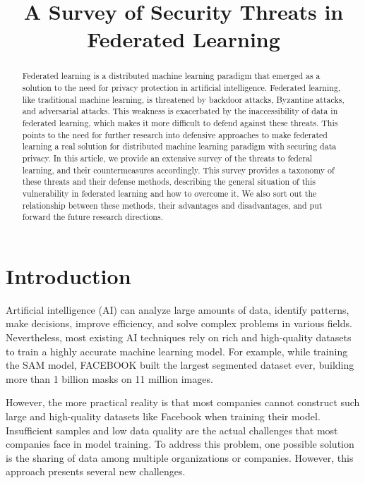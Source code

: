\documentclass[conference]{IEEEtran}
\begin{document}
\title{A Survey of Security Threats in Federated Learning}


\maketitle

\begin{abstract}
    Federated learning is a distributed machine learning paradigm that emerged as a solution to the need for privacy protection in artificial intelligence. 
    Federated learning, like traditional machine learning, is threatened by backdoor attacks, Byzantine attacks, and adversarial attacks. 
    This weakness is exacerbated by the inaccessibility of data in federated learning, 
    which makes it more difficult to defend against these threats.
    This points to the need for further research into defensive approaches to make federated learning a real solution for distributed machine learning paradigm with securing data privacy.
    In this article, we provide an extensive survey of the threats to federal learning, 
    and their countermeasures accordingly. 
    This survey provides a taxonomy of these threats and their defense methods, 
    describing the general situation of this vulnerability in federated learning and how to overcome it. 
    We also sort out the relationship between these methods, their advantages and disadvantages, and put forward the future research directions.
\end{abstract}



\section{Introduction}
Artificial intelligence (AI) can analyze large amounts of data, 
identify patterns, make decisions, improve efficiency, and solve complex problems 
in various fields.
Nevertheless, most existing AI techniques rely on rich and high-quality 
datasets to train a highly accurate machine learning model.
For example, while training the SAM model, 
FACEBOOK \cite{b1}  built the largest segmented dataset ever, 
building more than 1 billion masks on 11 million images.

However, the more practical reality is that most companies cannot 
construct such large and high-quality datasets like Facebook 
when training their model. 
Insufficient samples and low data quality are the actual challenges 
that most companies face in model training. 
To address this problem, one possible solution 
is the sharing of data among multiple organizations or companies. 
However, this approach presents several new challenges.
\end{document}
